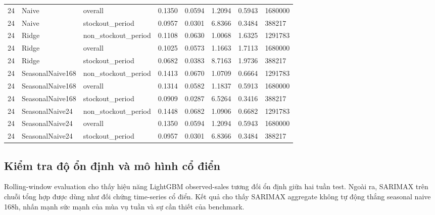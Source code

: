 \documentclass[12pt,a4paper]{article}
\begin{document}
\begin{table}[H]
{\begin{tabular}{llllllll}
24 & Naive & overall & 0.1350 & 0.0594 & 1.2094 & 0.5943 & 1680000 \\
24 & Naive & stockout\_period & 0.0957 & 0.0301 & 6.8366 & 0.3484 & 388217 \\
24 & Ridge & non\_stockout\_period & 0.1108 & 0.0630 & 1.0068 & 1.6325 & 1291783 \\
24 & Ridge & overall & 0.1025 & 0.0573 & 1.1663 & 1.7113 & 1680000 \\
24 & Ridge & stockout\_period & 0.0682 & 0.0383 & 8.7163 & 1.9736 & 388217 \\
24 & SeasonalNaive168 & non\_stockout\_period & 0.1413 & 0.0670 & 1.0709 & 0.6664 & 1291783 \\
24 & SeasonalNaive168 & overall & 0.1314 & 0.0582 & 1.1837 & 0.5913 & 1680000 \\
24 & SeasonalNaive168 & stockout\_period & 0.0909 & 0.0287 & 6.5264 & 0.3416 & 388217 \\
24 & SeasonalNaive24 & non\_stockout\_period & 0.1448 & 0.0682 & 1.0906 & 0.6682 & 1291783 \\
24 & SeasonalNaive24 & overall & 0.1350 & 0.0594 & 1.2094 & 0.5943 & 1680000 \\
24 & SeasonalNaive24 & stockout\_period & 0.0957 & 0.0301 & 6.8366 & 0.3484 & 388217 \\
\bottomrule
\end{tabular}
}
\end{table}

\subsection{Kiểm tra độ ổn định và mô hình cổ điển}
Rolling-window evaluation cho thấy hiệu năng LightGBM observed-sales tương đối ổn định giữa hai tuần test.
Ngoài ra, SARIMAX trên chuỗi tổng hợp được dùng như đối chứng time-series cổ điển.
Kết quả cho thấy SARIMAX aggregate không tự động thắng seasonal naive 168h, nhấn mạnh sức mạnh của mùa vụ tuần và sự cần thiết của benchmark.
\end{document}
